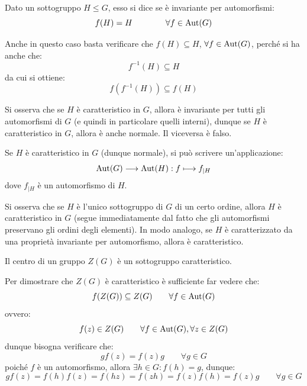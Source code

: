\documentclass[11pt]{scrartcl}
\begin{document}
\begin{definition}
    Dato un sottogruppo $H \leqslant G$, esso si dice  se è invariante per automorfismi:
        \[ f(H) = H
        \qquad \qquad \forall f \in \operatorname{Aut}(G)
            \]
\end{definition}

Anche in questo caso basta verificare che $f(H) \subseteq H$, $\forall f \in \operatorname{Aut}(G)$, perché si ha anche che:
    \[ f^{-1}(H) \subseteq H
        \]
da cui si ottiene:
    \[ f(f^{-1}(H)) \subseteq f(H)
        \]

\begin{remark}
    Si osserva che se $H$ è caratteristico in $G$, allora è invariante per tutti gli automorfismi di $G$ (e quindi in particolare quelli interni), dunque
    se $H$ è caratteristico in $G$, allora è anche normale. Il viceversa è falso.
\end{remark}

\begin{remark}
    Se $H$ è caratteristico in $G$ (dunque normale), si può scrivere un'applicazione:
        \[ \operatorname{Aut}(G) \longrightarrow \operatorname{Aut}(H) : f \longmapsto f_{\mid H}
            \]
    dove $f_{\mid H}$ è un automorfismo di $H$.
\end{remark}

\begin{remark}
    Si osserva che se $H$ è l'unico sottogruppo di $G$ di un certo ordine, allora $H$ è caratteristico in $G$ (segue immediatamente dal fatto che gli automorfismi
    preservano gli ordini degli elementi). In modo analogo, se $H$ è caratterizzato da una proprietà invariante per automorfismo, allora è caratteristico.
\end{remark}

\begin{exercise}
    Il centro di un gruppo $Z(G)$ è un sottogruppo caratteristico.
\end{exercise}
        
\begin{soln}
    Per dimostrare che $Z(G)$ è caratteristico è sufficiente far vedere che:
        \[ f(Z(G)) \subseteq Z(G)
        \qquad \forall f \in \operatorname{Aut}(G)
            \]
    ovvero:
        \[ f(z) \in Z(G)
        \qquad \forall f \in \operatorname{Aut}(G), \forall z \in Z(G)
            \]
    dunque bisogna verificare che:
        \[ gf(z) = f(z)g \qquad \forall g \in G
            \]
    poiché $f$ è un automorfismo, allora $\exists h \in G : f(h) = g$, dunque:
        \[ gf(z) = f(h)f(z) = f(hz) = f(zh) = f(z)f(h) = f(z)g \qquad \forall g \in G
            \]
\end{soln}
\end{document}
